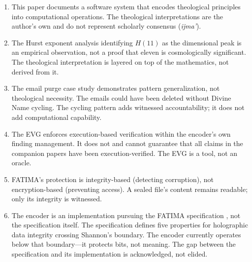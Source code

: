 \documentclass[11pt,a4paper]{article}
\begin{document}
\begin{enumerate}[nosep]
    \item This paper documents a software system that encodes theological principles into computational operations. The theological interpretations are the author's own and do not represent scholarly consensus (\textit{ijma'}).
    \item The Hurst exponent analysis identifying $H(11)$ as the dimensional peak is an empirical observation, not a proof that eleven is cosmologically significant. The theological interpretation is layered on top of the mathematics, not derived from it.
    \item The email purge case study demonstrates pattern generalization, not theological necessity. The emails could have been deleted without Divine Name cycling. The cycling pattern adds witnessed accountability; it does not add computational capability.
    \item The EVG enforces execution-based verification within the encoder's own finding management. It does not and cannot guarantee that all claims in the companion papers have been execution-verified. The EVG is a tool, not an oracle.
    \item FATIMA's protection is integrity-based (detecting corruption), not encryption-based (preventing access). A sealed file's content remains readable; only its integrity is witnessed.
    \item The encoder is an implementation pursuing the FATIMA specification \cite{arfeen2026fatima}, not the specification itself. The specification defines five properties for holographic data integrity crossing Shannon's boundary. The encoder currently operates below that boundary---it protects bits, not meaning. The gap between the specification and its implementation is acknowledged, not elided.
\end{enumerate}
\end{document}
